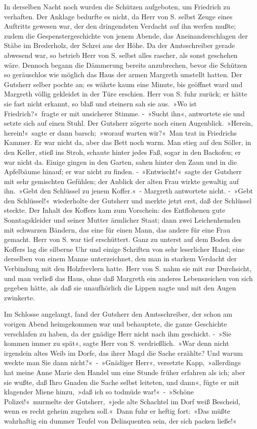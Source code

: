 In derselben Nacht noch wurden die Schützen aufgeboten, um Friedrich zu verhaften. Der Anklage bedurfte es nicht, da Herr von S. selbst Zeuge eines Auftritts gewesen war, der den dringendsten Verdacht auf ihn werfen mußte; zudem die Gespenstergeschichte von jenem Abende, das Aneinanderschlagen der Stäbe im Brederholz, der Schrei aus der Höhe. Da der Amtsschreiber gerade abwesend war, so betrieb Herr von S. selbst alles rascher, als sonst geschehen wäre. Dennoch begann die Dämmerung bereits anzubrechen, bevor die Schützen so geräuschlos wie möglich das Haus der armen Margreth umstellt hatten. Der Gutsherr selber pochte an; es währte kaum eine Minute, bis geöffnet ward und Margreth völlig gekleidet in der Türe erschien. Herr von S. fuhr zurück; er hätte sie fast nicht erkannt, so blaß und steinern sah sie aus. »Wo ist Friedrich?« fragte er mit unsicherer Stimme. - »Sucht ihn«, antwortete sie und setzte sich auf einen Stuhl. Der Gutsherr zögerte noch einen Augenblick. »Herein, herein!« sagte er dann barsch; »worauf warten wir?« Man trat in Friedrichs Kammer. Er war nicht da, aber das Bett noch warm. Man stieg auf den Söller, in den Keller, stieß ins Stroh, schaute hinter jedes Faß, sogar in den Backofen; er war nicht da. Einige gingen in den Garten, sahen hinter den Zaun und in die Apfelbäume hinauf; er war nicht zu finden. - »Entwischt!« sagte der Gutsherr mit sehr gemischten Gefühlen; der Anblick der alten Frau wirkte gewaltig auf ihn. »Gebt den Schlüssel zu jenem Koffer.« - Margreth antwortete nicht. - »Gebt den Schlüssel!« wiederholte der Gutsherr und merkte jetzt erst, daß der Schlüssel steckte. Der Inhalt des Koffers kam zum Vorschein: des Entflohenen gute Sonntagskleider und seiner Mutter ärmlicher Staat; dann zwei Leichenhemden mit schwarzen Bändern, das eine für einen Mann, das andere für eine Frau gemacht. Herr von S. war tief erschüttert. Ganz zu unterst auf dem Boden des Koffers lag die silberne Uhr und einige Schriften von sehr leserlicher Hand; eine derselben von einem Manne unterzeichnet, den man in starkem Verdacht der Verbindung mit den Holzfrevlern hatte. Herr von S. nahm sie mit zur Durchsicht, und man verließ das Haus, ohne daß Margreth ein anderes Lebenszeichen von sich gegeben hätte, als daß sie unaufhörlich die Lippen nagte und mit den Augen zwinkerte.

Im Schlosse angelangt, fand der Gutsherr den Amtsschreiber, der schon am vorigen Abend heimgekommen war und behauptete, die ganze Geschichte verschlafen zu haben, da der gnädige Herr nicht nach ihm geschickt. - »Sie kommen immer zu spät«, sagte Herr von S. verdrießlich. »War denn nicht irgendein altes Weib im Dorfe, das ihrer Magd die Sache erzählte? Und warum weckte man Sie dann nicht?« - »Gnädiger Herr«, versetzte Kapp, »allerdings hat meine Anne Marie den Handel um eine Stunde früher erfahren als ich; aber sie wußte, daß Ihro Gnaden die Sache selbst leiteten, und dann«, fügte er mit klagender Miene hinzu, »daß ich so todmüde war!« - »Schöne Polizei!« murmelte der Gutsherr, »jede alte Schachtel im Dorf weiß Bescheid, wenn es recht geheim zugehen soll.« Dann fuhr er heftig fort: »Das müßte wahrhaftig ein dummer Teufel von Delinquenten sein, der sich packen ließe!«

